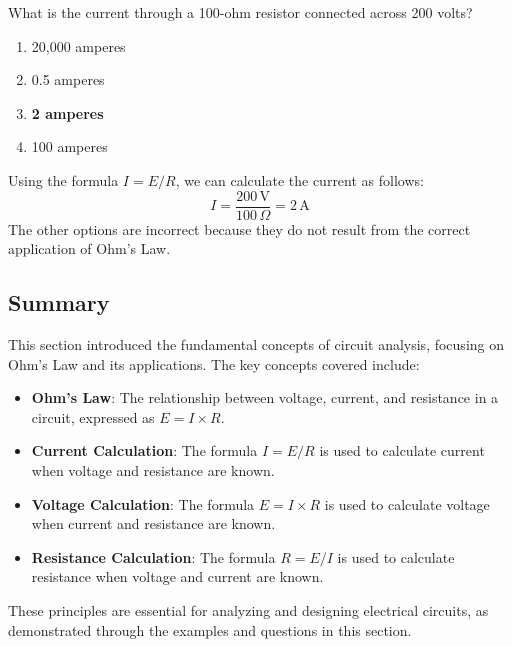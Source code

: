 
\begin{tcolorbox}[colback=gray!10!white,colframe=black!75!black,title={T5D08}]
    What is the current through a 100-ohm resistor connected across 200 volts?
    \begin{enumerate}[label=\Alph*,noitemsep]
        \item 20,000 amperes
        \item 0.5 amperes
        \item \textbf{2 amperes}
        \item 100 amperes
    \end{enumerate}
\end{tcolorbox}
Using the formula \(I = E / R\), we can calculate the current as follows:
\[
I = \frac{200\, \text{V}}{100\, \Omega} = 2\, \text{A}
\]
The other options are incorrect because they do not result from the correct application of Ohm's Law.


\subsection*{Summary}
This section introduced the fundamental concepts of circuit analysis, focusing on Ohm's Law and its applications. The key concepts covered include:

\begin{itemize}
    \item \textbf{Ohm's Law}: The relationship between voltage, current, and resistance in a circuit, expressed as \(E = I \times R\).
    \item \textbf{Current Calculation}: The formula \(I = E / R\) is used to calculate current when voltage and resistance are known.
    \item \textbf{Voltage Calculation}: The formula \(E = I \times R\) is used to calculate voltage when current and resistance are known.
    \item \textbf{Resistance Calculation}: The formula \(R = E / I\) is used to calculate resistance when voltage and current are known.
\end{itemize}

These principles are essential for analyzing and designing electrical circuits, as demonstrated through the examples and questions in this section.
